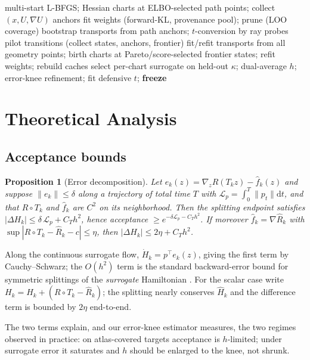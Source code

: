 \documentclass[10pt,journal,compsoc]{IEEEtran}
\newtheorem{proposition}{Proposition}
\newcommand{\dd}{\mathrm{d}}
\begin{document}
\begin{algorithm}[t]
\caption{Warm-up (all quantities frozen before production)}\label{alg:warm}
\begin{algorithmic}[1]
\State multi-start L-BFGS; Hessian charts at ELBO-selected path points;
  collect $(x,U,\nabla U)$ anchors
\State fit weights (forward-KL, provenance pool); prune (LOO coverage)
\State bootstrap transports from path anchors; $t$-conversion by ray probes
  \State pilot transitions (collect states, anchors, frontier)
  \State fit/refit transports from all geometry points; birth charts at
    Pareto/score-selected frontier states; refit weights; rebuild caches
\EndFor
\State select per-chart surrogate on held-out $\kappa$; dual-average $h$;
  error-knee refinement; fit defensive $t$; \textbf{freeze}
\end{algorithmic}
\end{algorithm}

\section{Theoretical Analysis}\label{sec:theory}
\subsection{Acceptance bounds}
\begin{proposition}[Error decomposition]\label{prop:accept}
Let $e_k(z)=\nabla_z R(T_kz)-\hat f_k(z)$ and suppose
$\|e_k\|\le\delta$ along a trajectory of total time $T$ with
$\mathcal L_p=\int_0^T\|p_t\|\dd t$, and that $R\circ T_k$ and $\hat f_k$
are $C^2$ on its neighborhood. Then the splitting endpoint satisfies
$|\Delta H_k|\le\delta\,\mathcal L_p+C_Th^2$, hence acceptance
$\ge e^{-\delta\mathcal L_p-C_Th^2}$. If moreover
$\hat f_k=\nabla\widehat R_k$ with
$\sup|R\circ T_k-\widehat R_k-c|\le\eta$, then
$|\Delta H_k|\le2\eta+C_Th^2$.
\end{proposition}
\begin{IEEEproof}
Along the continuous surrogate flow,
$\dot H_k=p^\top e_k(z)$, giving the first term by Cauchy--Schwarz; the
$O(h^2)$ term is the standard backward-error bound for symmetric splittings
of the \emph{surrogate} Hamiltonian \cite{leimkuhler2004}. For the scalar
case write $H_k=\widehat H_k+(R\circ T_k-\widehat R_k)$; the splitting
nearly conserves $\widehat H_k$ and the difference term is bounded by
$2\eta$ end-to-end.
\end{IEEEproof}

The two terms explain, and our error-knee estimator measures, the two
regimes observed in practice: on atlas-covered targets acceptance is
$h$-limited; under surrogate error it saturates and $h$ should be enlarged
to the knee, not shrunk.
\end{document}
